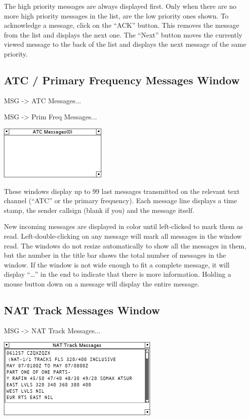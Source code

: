 \documentclass[11pt,a4paper]{memoir}
\newcommand{\colorref}[1]{\textit{\hyperref[#1]{\StrDel{#1}{color:}}}}
\begin{document}
The high priority messages are always displayed first. Only when there are no more high priority messages in the list, are the low priority ones shown. To acknowledge a message, click on the “ACK” button. This removes the message from the list and displays the next one. The “Next” button moves the currently viewed message to the back of the list and displays the next message of the same priority.

\subsection{ATC / Primary Frequency Messages Window}
\label{win:atcmw}
\label{win:pfmw}

\textit{} MSG -> ATC Messages...

\textit{} MSG -> Prim Freq Messages...

\includegraphics{img/atc.png}

These windows display up to 99 last messages transmitted on the relevant text channel (“ATC” or the primary frequency). Each message line displays a time stamp, the sender callsign (blank if you) and the message itself.

New incoming messages are displayed in \colorref{color:Warning} color until left-clicked to mark them as read. Left-double-clicking on any message will mark all messages in the window read. The windows do not resize automatically to show all the messages in them, but the number in the title bar shows the total number of messages in the window. If the window is not wide enough to fit a complete message, it will display “…” in the end to indicate that there is more information. Holding a mouse button down on a message will display the entire message.

\subsection{NAT Track Messages Window}
\label{win:nattmw}

\textit{} MSG -> NAT Track Messages...

\includegraphics{img/nat.png}
\end{document}
